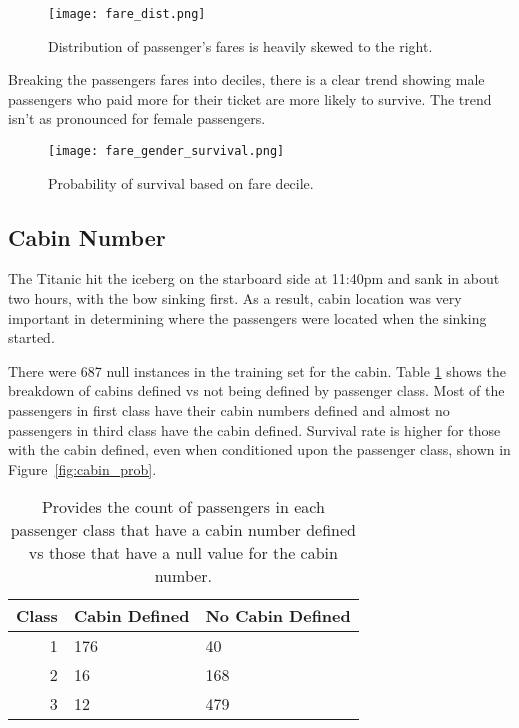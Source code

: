 \documentclass[12pt, letterpaper]{article}
\begin{document}
\begin{figure}[H]
    \centering
    \texttt{[image: fare\_dist.png]}
    \caption{Distribution of passenger's fares is heavily skewed to the right.}
    \label{fig:fare_dist}
\end{figure}

Breaking the passengers fares into deciles, there is a clear trend showing male passengers who paid more for their ticket are more likely to survive. The trend isn't as pronounced for female passengers. 

\begin{figure}[H]
    \centering
    \texttt{[image: fare\_gender\_survival.png]}
    \caption{Probability of survival based on fare decile.}
    \label{fig:fare_survival}
\end{figure}


\subsection{Cabin Number}

The Titanic hit the iceberg on the starboard side at 11:40pm and sank in about two hours, with the bow sinking first. As a result, cabin location was very important in determining where the passengers were located when the sinking started. 

There were 687 null instances in the training set for the cabin. Table \ref{tab:cabin} shows the breakdown of cabins defined vs not being defined by passenger class. Most of the passengers in first class have their cabin numbers defined and almost no passengers in third class have the cabin defined. Survival rate is higher for those with the cabin defined, even when conditioned upon the passenger class, shown in Figure~\ref{fig:cabin_prob}. 

\begin{table}[H]
    \centering
    \begin{tabular}{rll}
    Class & Cabin Defined & No Cabin Defined \\
    \hline
    1 & 176 & 40 \\
    2 & 16 & 168 \\
    3 & 12 & 479
    \end{tabular}
    \caption{Provides the count of passengers in each passenger class that have a cabin number defined vs those that have a null value for the cabin number.}
    \label{tab:cabin}
\end{table}
\end{document}
